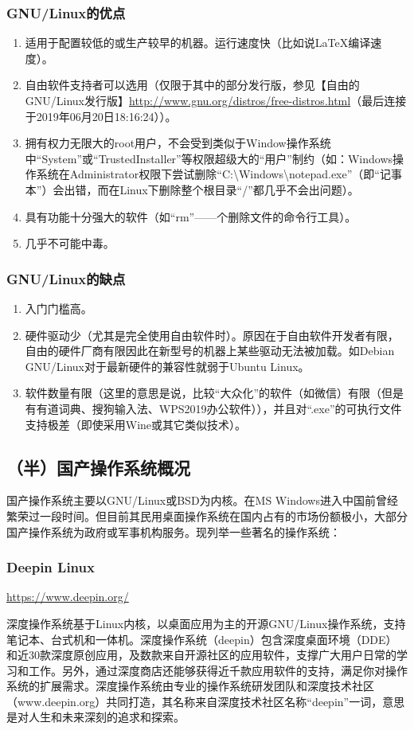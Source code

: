 \subsubsection{GNU/Linux的优点}
\begin{enumerate}
	\item  适用于配置较低的或生产较早的机器。运行速度快（比如说\LaTeX 编译速度）。\par
	\item 自由软件支持者可以选用（仅限于其中的部分发行版，参见【自由的GNU/Linux发行版】\url{http://www.gnu.org/distros/free-distros.html}（最后连接于2019年06月20日18:16:24））。\par
	\item 拥有权力无限大的root用户，不会受到类似于Window操作系统中“System”或“TrustedInstaller”等权限超级大的“用户”制约（如：Windows操作系统在Administrator权限下尝试删除“C:\textbackslash Windows\textbackslash notepad.exe”（即“记事本”）会出错，而在Linux下删除整个根目录“/”都几乎不会出问题）。\par
	\item 具有功能十分强大的软件（如“rm”——个删除文件的命令行工具）。
	\item 几乎不可能中毒。
\end{enumerate}
\subsubsection{GNU/Linux的缺点}
\begin{enumerate}
	\item 入门门槛高。
	\item 硬件驱动少（尤其是完全使用自由软件时）。原因在于自由软件开发者有限，自由的硬件厂商有限因此在新型号的机器上某些驱动无法被加载。如Debian GNU/Linux对于最新硬件的兼容性就弱于Ubuntu Linux。
	\item 软件数量有限（这里的意思是说，比较“大众化”的软件（如微信）有限（但是有有道词典、搜狗输入法、WPS2019办公软件）），并且对“.exe”的可执行文件支持极差（即使采用Wine或其它类似技术）。	
\end{enumerate}
\subsection{（半）国产操作系统概况}
国产操作系统主要以GNU/Linux或BSD为内核。在MS Windows进入中国前曾经繁荣过一段时间。但目前其民用桌面操作系统在国内占有的市场份额极小，大部分国产操作系统为政府或军事机构服务。现列举一些著名的操作系统：
\subsubsection{Deepin Linux}
\url{https://www.deepin.org/}\par
\cite{deepininfo}深度操作系统基于Linux内核，以桌面应用为主的开源GNU/Linux操作系统，支持笔记本、台式机和一体机。深度操作系统（deepin）包含深度桌面环境（DDE）和近30款深度原创应用，及数款来自开源社区的应用软件，支撑广大用户日常的学习和工作。另外，通过深度商店还能够获得近千款应用软件的支持，满足你对操作系统的扩展需求。深度操作系统由专业的操作系统研发团队和深度技术社区（www.deepin.org）共同打造，其名称来自深度技术社区名称“deepin”一词，意思是对人生和未来深刻的追求和探索。
